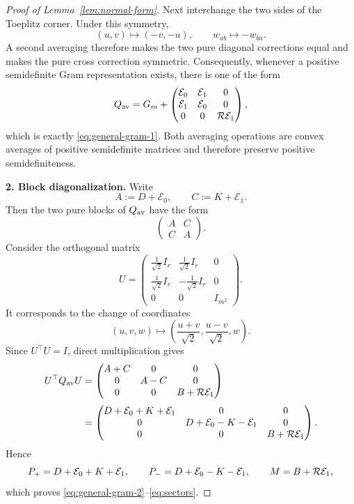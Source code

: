 \begin{proof}[Proof of Lemma~\ref{lem:normal-form}]
Next interchange the two sides of the Toeplitz corner.  Under this
symmetry,
\[
                         (u,v)\longmapsto(-v,-u),
 \qquad
                         w_{ab}\longmapsto-w_{ba}.
\]
A second averaging therefore makes the two pure diagonal corrections
equal and makes the pure cross correction symmetric.  Consequently,
whenever a positive semidefinite Gram representation exists, there is
one of the form
\[
 Q_{\rm av}
 =
 G_m+
 \begin{pmatrix}
 \mathcal E_0&\mathcal E_1&0\\
 \mathcal E_1&\mathcal E_0&0\\
 0&0&\mathcal{R}\mathcal E_1
 \end{pmatrix},
\]
which is exactly \eqref{eq:general-gram-1}.  Both averaging operations
are convex averages of positive semidefinite matrices and therefore
preserve positive semidefiniteness.

\medskip
\noindent
\textbf{2. Block diagonalization.}
Write
\[
 A:=D+\mathcal E_0,
 \qquad
 C:=K+\mathcal E_1.
\]
Then the two pure blocks of $Q_{\rm av}$ have the form
\[
 \begin{pmatrix}
 A&C\\
 C&A
 \end{pmatrix}.
\]
Consider the orthogonal matrix
\[
 U=
 \begin{pmatrix}
 \frac1{\sqrt2}I_r&\frac1{\sqrt2}I_r&0\\
 \frac1{\sqrt2}I_r&-\frac1{\sqrt2}I_r&0\\
 0&0&I_{m^2}
 \end{pmatrix}.
\]
It corresponds to the change of coordinates
\[
 (u,v,w)
 \longmapsto
 \left(
 \frac{u+v}{\sqrt2},
 \frac{u-v}{\sqrt2},
 w
 \right).
\]
Since $U^\top U=I$, direct multiplication gives
\[
\begin{aligned}
 U^\top Q_{\rm av}U
 &=
 \begin{pmatrix}
 A+C&0&0\\
 0&A-C&0\\
 0&0&B+\mathcal{R}\mathcal E_1
 \end{pmatrix}                                                   \\[1mm]
 &=
 \begin{pmatrix}
 D+\mathcal E_0+K+\mathcal E_1&0&0\\
 0&D+\mathcal E_0-K-\mathcal E_1&0\\
 0&0&B+\mathcal{R}\mathcal E_1
 \end{pmatrix}.
\end{aligned}
\]
Hence
\[
 P_+=D+\mathcal E_0+K+\mathcal E_1,\qquad
 P_-=D+\mathcal E_0-K-\mathcal E_1,\qquad
 M=B+\mathcal{R}\mathcal E_1,
\]
which proves \eqref{eq:general-gram-2}--\eqref{eq:sectors}.


\end{proof}
